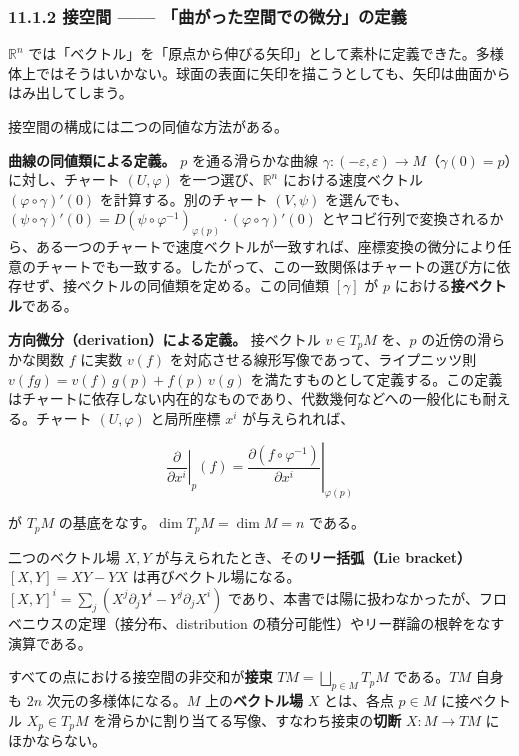 \documentclass[a4paper,12pt,openany]{book}
\begin{document}
\hypertarget{ux63a5ux7a7aux9593-ux66f2ux304cux3063ux305fux7a7aux9593ux3067ux306eux5faeux5206ux306eux5b9aux7fa9}{%
\subsubsection{11.1.2 接空間 ——
「曲がった空間での微分」の定義}\label{ux63a5ux7a7aux9593-ux66f2ux304cux3063ux305fux7a7aux9593ux3067ux306eux5faeux5206ux306eux5b9aux7fa9}}

\(\mathbb{R}^n\)
では「ベクトル」を「原点から伸びる矢印」として素朴に定義できた。多様体上ではそうはいかない。球面の表面に矢印を描こうとしても、矢印は曲面からはみ出してしまう。

接空間の構成には二つの同値な方法がある。

\textbf{曲線の同値類による定義。} \(p\) を通る滑らかな曲線
\(\gamma: (-\varepsilon, \varepsilon) \to M\)（\(\gamma(0)=p\)）に対し、チャート
\((U, \varphi)\) を一つ選び、\(\mathbb{R}^n\) における速度ベクトル
\((\varphi \circ \gamma)'(0)\) を計算する。別のチャート \((V, \psi)\)
を選んでも、\((\psi \circ \gamma)'(0) = D(\psi \circ \varphi^{-1})_{\varphi(p)} \cdot (\varphi \circ \gamma)'(0)\)
とヤコビ行列で変換されるから、ある一つのチャートで速度ベクトルが一致すれば、座標変換の微分により任意のチャートでも一致する。したがって、この一致関係はチャートの選び方に依存せず、接ベクトルの同値類を定める。この同値類
\([\gamma]\) が \(p\) における\textbf{接ベクトル}である。

\textbf{方向微分（derivation）による定義。} 接ベクトル \(v \in T_p M\)
を、\(p\) の近傍の滑らかな関数 \(f\) に実数 \(v(f)\)
を対応させる線形写像であって、ライプニッツ則
\(v(fg) = v(f)\,g(p) + f(p)\,v(g)\)
を満たすものとして定義する。この定義はチャートに依存しない内在的なものであり、代数幾何などへの一般化にも耐える。チャート
\((U, \varphi)\) と局所座標 \(x^i\) が与えられれば、

\[\left.\frac{\partial}{\partial x^i}\right|_p (f) = \left.\frac{\partial (f \circ \varphi^{-1})}{\partial x^i}\right|_{\varphi(p)}\]

が \(T_p M\) の基底をなす。\(\dim T_p M = \dim M = n\) である。

二つのベクトル場 \(X, Y\)
が与えられたとき、その\textbf{リー括弧（Lie bracket）}
\([X, Y] = XY - YX\)
は再びベクトル場になる。\([X,Y]^i = \sum_j (X^j \partial_j Y^i - Y^j \partial_j X^i)\)
であり、本書では陽に扱わなかったが、フロベニウスの定理（接分布、distribution
の積分可能性）やリー群論の根幹をなす演算である。

すべての点における接空間の非交和が\textbf{接束}
\(TM = \bigsqcup_{p \in M} T_p M\) である。\(TM\) 自身も \(2n\)
次元の多様体になる。\(M\) 上の\textbf{ベクトル場} \(X\) とは、各点
\(p \in M\) に接ベクトル \(X_p \in T_p M\)
を滑らかに割り当てる写像、すなわち接束の\textbf{切断} \(X: M \to TM\)
にほかならない。
\end{document}
